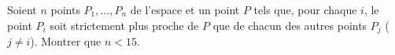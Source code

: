 Soient $n$ points $P_1, \ldots, P_n$ de l'espace et un point $P$ tels que, pour chaque $i$, le point $P_i$ soit strictement plus proche de $P$ que de chacun des autres points $P_j$ ($j \neq i$). Montrer que $n < 15$.
